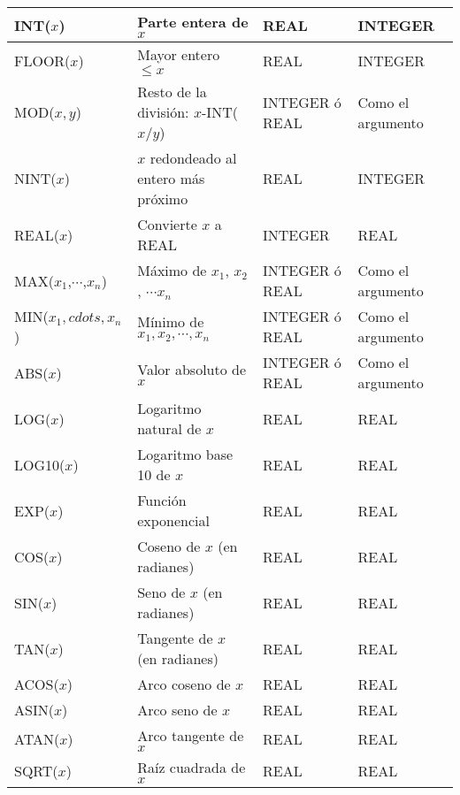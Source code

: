 \documentclass[11pt]{exam}
\begin{document}
\begin{questions}
\begin{tabular}{|p{2.5cm}|p{6.5cm}|p{3.5cm}|p{3.5cm}|}
INT($x$)&           Parte entera de $x$ &                      REAL &          INTEGER\\ \hline 
FLOOR($x$)&         Mayor entero $\leq x$  &                      REAL &          INTEGER\\ \hline 
MOD($x, y$)&        Resto de la divisi\'on: $x$-INT($x/y$) &       INTEGER \'o REAL& Como el argumento\\ \hline 
NINT($x$)  &        $x$ redondeado al entero m\'as pr\'oximo&      REAL  &         INTEGER\\ \hline 
REAL($x$)  &        Convierte $x$ a REAL  &                 INTEGER&        REAL\\ \hline 
MAX($x_1$,$\cdots$,$x_n$)&     M\'aximo de $x_1$, $x_2$, $\cdots x_n$ &                  INTEGER \'o REAL& Como el argumento\\ \hline 
MIN($x_1,cdots,x_n$) &    M\'inimo de $x_1, x_2, \cdots, x_n$ &                  INTEGER \'o REAL& Como el argumento\\ \hline 
ABS($x$)   &        Valor absoluto de $x$    &                 INTEGER \'o REAL& Como el argumento\\ \hline 
LOG($x$)   &        Logaritmo natural de $x$ &                 REAL           &REAL\\ \hline
LOG10($x$)   &        Logaritmo base 10 de $x$ &                 REAL           &REAL\\ \hline  
EXP($x$)   &        Funci\'on exponencial    &                 REAL           &REAL\\ \hline 
COS($x$)   &        Coseno de $x$ (en radianes)&               REAL           &REAL\\ \hline 
SIN($x$)   &        Seno de $x$ (en radianes)   &              REAL           &REAL\\ \hline 
TAN($x$)   &        Tangente de $x$ (en radianes)&             REAL           &REAL\\ \hline 
ACOS($x$)  &        Arco coseno de $x$           &             REAL           &REAL\\ \hline 
ASIN($x$)  &        Arco seno de $x$             &            REAL           &REAL\\ \hline 
ATAN($x$)  &        Arco tangente de $x$         &             REAL           &REAL\\ \hline 
SQRT($x$)  &        Ra\'iz cuadrada de $x$ &                     REAL           &REAL\\ \hline 

\end{tabular} 
\end{questions}
\end{document}
